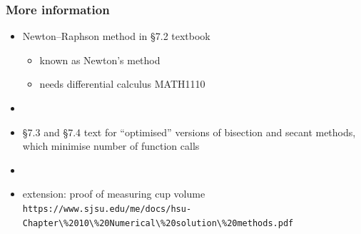 \documentclass[english,14pt]{beamer}
\newcommand\red[1]{{\color{red} #1}}
\begin{document}
\begin{frame}[fragile]

\frametitle{More information}
\begin{itemize}
	\item Newton--Raphson method in \red{\S7.2} textbook
	\begin{itemize}
		\item known as Newton's method
		\item needs differential calculus MATH1110
	\end{itemize}
	\item[]
	
	\item \red{\S7.3} and \red{\S7.4 }text for ``optimised'' versions of bisection and secant methods, which minimise number of function calls

	\item[]
	
	\item extension: proof of measuring cup volume \verb+https://www.sjsu.edu/me/docs/hsu-Chapter\%2010\%20Numerical\%20solution\%20methods.pdf+
	
\end{itemize}

\end{frame}
\end{document}
